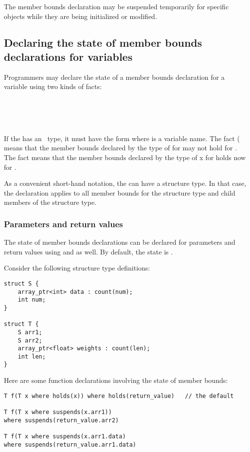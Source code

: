 The member bounds
declaration may be suspended temporarily for specific objects while they are being
initialized or modified.

\subsection{Declaring the state of member bounds declarations for variables}

Programmers may declare the state of a member bounds declaration
for a variable using two kinds of facts:
\begin{tabbing}
\= \\
\> \var{\ldots{}} \\
\> \code{)} \\
\> \code{)}
\end{tabbing}

If the  has an \arrayptr\ type, it must
have the form  where  is a variable name. 
The fact (\code{)} means that the
member bounds declared by the type of  for  may not
hold for . The fact \code{)}
means that the member bounds declared by the type of x for 
holds now for .

As a convenient short-hand notation, the  can have
a structure type. In that case, the declaration applies to all member
bounds for the structure type and child members of the structure type.

\subsubsection{Parameters and return values}

The state of member bounds declarations can be declared for parameters and
return values using  and  as well. By
default, the state is .

Consider the following structure type definitions:

\begin{lstlisting}
struct S {
    array_ptr<int> data : count(num);
    int num;
}

struct T {
    S arr1;
    S arr2;
    array_ptr<float> weights : count(len);
    int len;
}
\end{lstlisting}

Here are some function declarations involving the state of member
bounds:
\begin{lstlisting}
T f(T x where holds(x)) where holds(return_value)   // the default 

T f(T x where suspends(x.arr1))
where suspends(return_value.arr2)

T f(T x where suspends(x.arr1.data)
where suspends(return_value.arr1.data)
\end{lstlisting}


